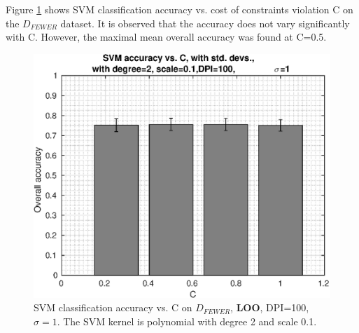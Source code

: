 Figure \ref{fig:pca-svm-acc-vs-C} shows SVM classification accuracy vs.
cost of constraints violation C on the \(D_{FEWER}\) dataset.
It is observed that the accuracy does not vary significantly with C.
However, the maximal mean overall accuracy was found at C=0.5.
\begin{figure}[ht]
\centering
\includegraphics[width=\figscale]{img/pca-svm-acc-vs-C-dpi100-sigma1}
\caption[SVM classification accuracy vs. C on $D_{FEWER}$, \textbf{LOO}.]{
SVM classification accuracy vs. C on $D_{FEWER}$, \textbf{LOO}, DPI=100, $\sigma=1$.
The SVM kernel is polynomial with degree 2 and scale 0.1.
}
\label{fig:pca-svm-acc-vs-C}
\end{figure}

\clearpage

